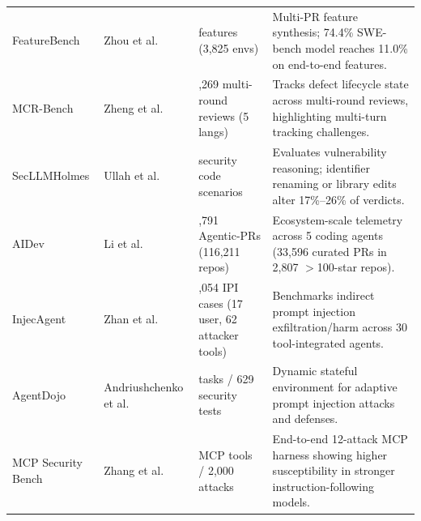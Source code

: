 \documentclass[10pt,twocolumn,a4paper]{article}
\begin{document}
\begin{table}[t!]
\begin{tabularx}{\textwidth}{>{\raggedright\arraybackslash}p{2.15cm} >{\raggedright\arraybackslash}p{2.65cm} >{\raggedright\arraybackslash}p{2.55cm} X}
FeatureBench & Zhou et al.~\cite{zhou2026featurebench} & 200 features (3,825 envs) & Multi-PR feature synthesis; 74.4\% SWE-bench model reaches 11.0\% on end-to-end features. \\
MCR-Bench & Zheng et al.~\cite{zheng2026static} & 2,269 multi-round reviews (5 langs) & Tracks defect lifecycle state across multi-round reviews, highlighting multi-turn tracking challenges. \\
SecLLMHolmes & Ullah et al.~\cite{ullah2024llms} & 228 security code scenarios & Evaluates vulnerability reasoning; identifier renaming or library edits alter 17\%--26\% of verdicts. \\
AIDev & Li et al.~\cite{li2026aidev} & 932,791 Agentic-PRs (116,211 repos) & Ecosystem-scale telemetry across 5 coding agents (33,596 curated PRs in 2,807 $>$100-star repos). \\
InjecAgent & Zhan et al.~\cite{zhan2024injecagent} & 1,054 IPI cases (17 user, 62 attacker tools) & Benchmarks indirect prompt injection exfiltration/harm across 30 tool-integrated agents. \\
AgentDojo & Andriushchenko et al.~\cite{andriushchenko2024agentdojo} & 97 tasks / 629 security tests & Dynamic stateful environment for adaptive prompt injection attacks and defenses. \\
MCP Security Bench & Zhang et al.~\cite{zhang2025mcp} & 405 MCP tools / 2,000 attacks & End-to-end 12-attack MCP harness showing higher susceptibility in stronger instruction-following models. \\
\bottomrule
\end{tabularx}
\end{table}
\end{document}
